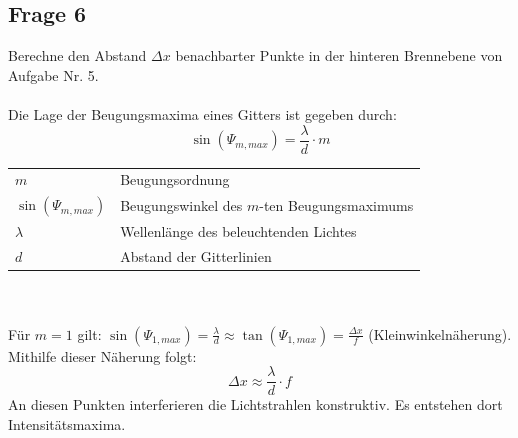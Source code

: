 \documentclass[a4paper,10pt]{scrartcl}
\begin{document}
	\subsection{Frage 6}
		Berechne den Abstand $\Delta x$ benachbarter Punkte in der hinteren Brennebene von\\Aufgabe Nr. 5.
		\\
		\\
		Die Lage der Beugungsmaxima eines Gitters ist gegeben durch:
			\[\sin(\Psi_{m,max}) = \frac{\lambda}{d} \cdot m\]
		\begin{tabular}{ll}
			$m$ & Beugungsordnung\\
			$\sin(\Psi_{m,max})$ & Beugungswinkel des $m$-ten Beugungsmaximums\\
			$\lambda$ & Wellenlänge des beleuchtenden Lichtes\\
			$d$ & Abstand der Gitterlinien
		\end{tabular}
		\\
		\\
		Für $m = 1$ gilt: $\sin(\Psi_{1,max}) = \frac{\lambda}{d} \approx \tan(\Psi_{1,max}) = \frac{\Delta x}{f}$ (Kleinwinkelnäherung).\\
		Mithilfe dieser Näherung folgt:
			\[\Delta x \approx \frac{\lambda}{d} \cdot f\]
		An diesen Punkten interferieren die Lichtstrahlen konstruktiv. Es entstehen dort Intensitätsmaxima.
\end{document}
